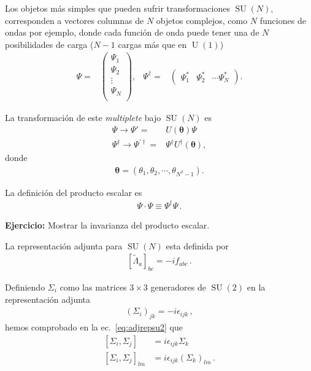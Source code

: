 \begin{frame}
Los objetos más simples que pueden sufrir transformaciones  $\operatorname{SU}(N)$, corresponden a vectores columnas de $N$ objetos complejos, como $N$ funciones de ondas por ejemplo, donde cada función de onda puede tener una de $N$ posibilidades de carga ($N-1$ cargas más que en $\operatorname{U}(1)$)
\begin{align}
  \Psi=&
  \begin{pmatrix}
    \Psi_1\\
    \Psi_2\\
    \vdots\\
    \Psi_N\\
  \end{pmatrix},&
  \Psi^{\dagger}=&
  \begin{pmatrix}
    \Psi_1^{*} &
    \Psi_2^{*}& \cdots \Psi_N^{*} 
  \end{pmatrix}.                  
\end{align}

La transformación de este \emph{multiplete} bajo $\operatorname{SU}(N)$ es
\begin{align}
  \Psi\to \Psi'=& U(\boldsymbol{\theta}) \Psi \nonumber\\
  \Psi^{\dagger}\to \Psi^{\prime\dagger} =& \Psi^{\dagger}U^{\dagger}(\boldsymbol{\theta}),
\end{align}
donde
\begin{align}
  \boldsymbol{\theta}=\left(\theta_1,\theta_2,\cdots,\theta_{N^2-1}  \right).
\end{align}

La definición del producto escalar es
\begin{align}
   \Psi \cdot \Psi \equiv \Psi^{\dagger}\Psi\,. 
\end{align}
\end{frame}

\textbf{Ejercicio:} Mostrar la invarianza del producto escalar.


\begin{frame}
La representación adjunta para $\operatorname{SU}(N)$ esta definida por
\begin{align}
  \left[ \widetilde{\Lambda}_a \right]_{bc}=-i f_{abc}\,.
\end{align}
\end{frame}

Definiendo $\Sigma_i$ como las matrices $3\times3$ generadores de $\operatorname{SU}(2)$ en la representación adjunta
\begin{align}
  (\Sigma_i)_{jk}=-i\epsilon_{ijk}\,,
\end{align}
hemos comprobado en la ec.~\eqref{eq:adjrepsu2} que
\begin{align}
  \left[{\Sigma_i},{\Sigma_j}\right]&=i\epsilon_{ijk}{\Sigma_k}\nonumber\\
  \left[{\Sigma_i},{\Sigma_j}\right]_{lm}&=i\epsilon_{ijk}(\Sigma_k)_{lm}\,.
\end{align}

